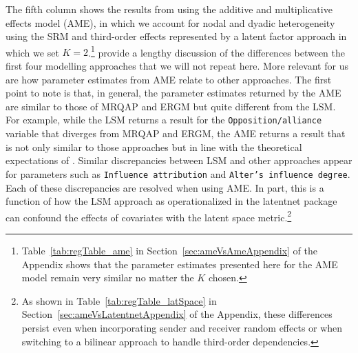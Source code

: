 \documentclass[12pt,pdflatex]{elsarticle}
\newcommand{\pkg}[1]{{\fontseries{b}\selectfont #1}}
\begin{document}
The fifth column shows the results from using the additive and multiplicative effects model (AME), in which we account for nodal and dyadic heterogeneity using the SRM and third-order effects represented by a latent factor approach in which we set $K=2$.\footnote{Table~\ref{tab:regTable_ame} in Section~\ref{sec:ameVsAmeAppendix} of the Appendix shows that the parameter estimates presented here for the AME model remain very similar no matter the $K$ chosen.} \citet{cranmer:etal:2016} provide a lengthy discussion of the differences between the first four modelling approaches that we will not repeat here. More relevant for us are how parameter estimates from AME relate to other approaches. The first point to note is that, in general, the parameter estimates returned by the AME are similar to those of MRQAP and ERGM but quite different from the LSM. For example, while the LSM returns a result for the \texttt{Opposition/alliance} variable that diverges from MRQAP and ERGM, the AME returns a result that is not only similar to those approaches but in line with the theoretical expectations of \citet{ingold:fischer:2014}. Similar discrepancies between LSM and other approaches appear for parameters such as \texttt{Influence attribution} and \texttt{Alter's influence degree}. Each of these discrepancies are resolved when using AME. In part, this is a function of  how the LSM approach as operationalized in the \pkg{latentnet} package can confound the effects of covariates with the latent space metric.\footnote{As shown in Table~\ref{tab:regTable_latSpace} in Section~\ref{sec:ameVsLatentnetAppendix} of the Appendix, these differences persist even when incorporating sender and receiver random effects or when switching to a bilinear approach to handle third-order dependencies.} %
\end{document}
